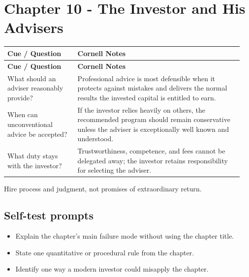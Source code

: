 \documentclass[11pt]{article}
\begin{document}
\section{Chapter 10 - The Investor and His Advisers}
\begin{longtable}{@{}>{\raggedright\arraybackslash}p{0.29\linewidth}>{\raggedright\arraybackslash}p{0.66\linewidth}@{}}\toprule\textbf{Cue / Question} & \textbf{Cornell Notes}\\\midrule\endfirsthead\toprule\textbf{Cue / Question} & \textbf{Cornell Notes}\\\midrule\endhead
What should an adviser reasonably provide? & Professional advice is most defensible when it protects against mistakes and delivers the normal results the invested capital is entitled to earn. \\
When can unconventional advice be accepted? & If the investor relies heavily on others, the recommended program should remain conservative unless the adviser is exceptionally well known and understood. \\
What duty stays with the investor? & Trustworthiness, competence, and fees cannot be delegated away; the investor retains responsibility for selecting the adviser. \\
\bottomrule\end{longtable}
\begin{principlebox}Hire process and judgment, not promises of extraordinary return.\end{principlebox}
\subsection*{Self-test prompts}\begin{itemize}\item Explain the chapter's main failure mode without using the chapter title.\item State one quantitative or procedural rule from the chapter.\item Identify one way a modern investor could misapply the chapter.\end{itemize}
\end{document}
